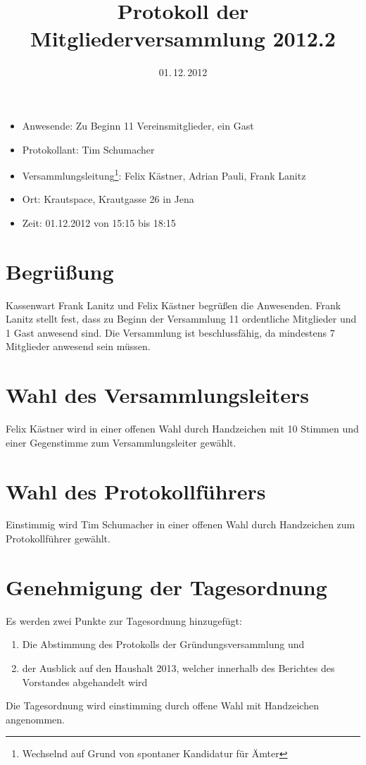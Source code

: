 \documentclass{scrartcl}
\title{Protokoll der Mitgliederversammlung 2012.2}
\date{01.\,12.\,2012}
\begin{document}
\maketitle{}


\begin{itemize}
\item Anwesende: Zu Beginn 11 Vereinsmitglieder, ein Gast
\item Protokollant: Tim Schumacher
\item Versammlungsleitung\footnote{Wechselnd auf Grund von spontaner
Kandidatur für Ämter}: Felix Kästner, Adrian Pauli, Frank Lanitz
\item Ort: Krautspace, Krautgasse 26 in Jena
\item Zeit: 01.12.2012 von 15:15 bis 18:15
\end{itemize}

\section{Begrüßung}
Kassenwart Frank Lanitz und Felix Kästner begrüßen die Anwesenden. Frank
Lanitz stellt fest, dass zu Beginn der Versammlung 11 ordentliche
Mitglieder und 1 Gast anwesend sind. Die Versammlung ist beschlussfähig,
da mindestens 7 Mitglieder anwesend sein müssen.

\section{Wahl des Versammlungsleiters}
Felix Kästner wird in einer offenen Wahl durch Handzeichen mit 10
Stimmen und einer Gegenstimme zum Versammlungsleiter gewählt.

\section{Wahl des Protokollführers}
Einstimmig wird Tim Schumacher in einer offenen Wahl durch Handzeichen
zum Protokollführer gewählt.

\section{Genehmigung der Tagesordnung}

Es werden zwei Punkte zur Tagesordnung hinzugefügt:
\begin{enumerate}
	\item Die Abstimmung des Protokolls der Gründungsversammlung und
	\item der Ausblick auf den Haushalt 2013, welcher innerhalb des
Berichtes des Vorstandes abgehandelt wird
\end{enumerate}
Die Tagesordnung wird einstimming durch offene Wahl mit Handzeichen
angenommen.
\end{document}
